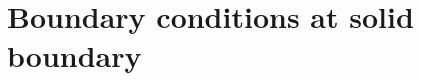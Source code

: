 \section{Boundary conditions at solid boundary}
\label{sec:boundaryConditions}
%
%
%
%
%
%
%
%
%
%
%
%
%
